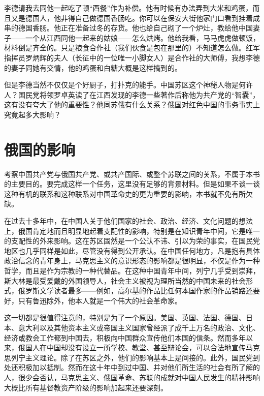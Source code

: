 \documentclass[10pt]{book}
\begin{document}
李德请我去同他一起吃了顿“西餐”作为补偿。他有时候有办法弄到大米和鸡蛋，而且又是德国人，他非得自己做德国香肠吃。你可以在保安大街他家门口看到挂着成串的德国香肠。他正在准备过冬的存货。他也给自己砌了一个炉灶，教给他中国妻子——一个从江西同他一起来的姑娘——怎么烘烤。他给我看，马马虎虎做顿饭，材料倒是齐全的。只是粮食合作社（我们伙食是包在那里的）不知道怎么做。红军指挥员罗炳辉的夫人（长征中的一位唯一小脚女人）是合作社的大师傅，我想李德的妻子同她有交情，他的鸡蛋和白糖大概是这样搞到的。

但是李德当然不仅仅是个好厨子，打扑克的能手。中国苏区这个神秘人物是何许人？国民党将领罗卓英读了在江西发现的李德一些著作后称他为共产党的“智囊”，这有没有夸大了他的重要性？他同苏俄有什么关系？俄国对红色中国的事务事实上究竟起多大影响？



\section{俄国的影响}

考察中国共产党与俄国共产党、或共产国际、或整个苏联之间的关系，不属于本书的主要目的。要完成这样一个任务，这里没有足够的背景材料。但是如果不谈一谈这种有机的联系和这种联系对中国革命史的更为重要的影响，本书就不免有所欠缺。

在过去十多年中，在中国人关于他们国家的社会、政治、经济、文化问题的想法上，俄国肯定地而且明显地起着支配性的影响，特别是在知识青年中间，它是唯一的支配性的外来影响。这在苏区固然是一个公认不讳、引以为荣的事实，在国民党地区也几乎同样是如此，尽管没有得到公开承认。在中国任何地方，凡是抱有具体政治信念的青年身上，马克思主义的意识形态的影响都是很明显，不仅是作为一种哲学，而且是作为宗教的一种代替品。在这种中国青年中间，列宁几乎受到崇拜，斯大林是最受爱戴的外国领导人，社会主义被视为理所当然的中国未来的社会形式，俄罗斯文学读者最多——例如，高尔基的作品比任何本国作家的作品销路还要好，只有鲁迅除外，他本人就是一个伟大的社会革命家。

这一切都是很值得注意的，特别是为了一个原因。美国、英国、法国、德国、日本、意大利以及其他资本主义或帝国主义国家曾经派了成千上万名的政治、文化、经济或教会工作都到中国去，积极向中国群众宣传他们本国的信条。然而多年以来，俄国人在中国却没有设立一所学校、教堂、甚至辩论会，可以合法地宣传马克思列宁主义理论。除了在苏区之外，他们的影响基本上是间接的。此外，国民党到处还积极加以抵制。然而在这十年中到过中国、并对他们所生活的社会有所了解的人，很少会否认，马克思主义、俄国革命、苏联的成就对中国人民发生的精神影响大概比所有基督教资产阶级的影响加起来还要深刻。
\end{document}
